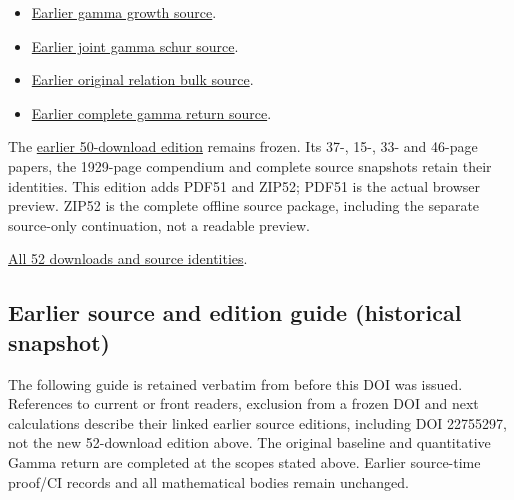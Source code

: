 \documentclass[
]{article}
\providecommand{\tightlist}{%
  \setlength{\itemsep}{0pt}\setlength{\parskip}{0pt}}
\begin{document}
\begin{itemize}
\tightlist
\item
  \href{https://github.com/KokunoYumeto/zeta-function-research-reader/tree/41f020e0475429943252e69a1b4edd849393c780/workbenches/splitzero-tandem/continuations/20260914-gamma-growth}{Earlier
  gamma growth source}.
\item
  \href{https://github.com/KokunoYumeto/zeta-function-research-reader/tree/2be3b23974bf040f4ea06240b8a4b85372f7c71d/workbenches/splitzero-tandem/continuations/20260914-joint-gamma-schur}{Earlier
  joint gamma schur source}.
\item
  \href{https://github.com/KokunoYumeto/zeta-function-research-reader/tree/01fc8820e3a3ea69afa22b8ab1b0b5ca61869456/workbenches/splitzero-tandem/continuations/20260914-original-relation-bulk}{Earlier
  original relation bulk source}.
\item
  \href{https://github.com/KokunoYumeto/zeta-function-research-reader/tree/01fc8820e3a3ea69afa22b8ab1b0b5ca61869456/workbenches/splitzero-tandem/continuations/20260914-complete-gamma-return}{Earlier
  complete gamma return source}.
\end{itemize}

The \href{https://doi.org/10.5281/zenodo.22755297}{earlier 50-download
edition} remains frozen. Its 37-, 15-, 33- and 46-page papers, the
1929-page compendium and complete source snapshots retain their
identities. This edition adds PDF51 and ZIP52; PDF51 is the actual
browser preview. ZIP52 is the complete offline source package, including
the separate source-only continuation, not a readable preview.

\href{calculation_edition_20260914_original_volumes/README.md}{All 52
downloads and source identities}.

\subsection{Earlier source and edition guide (historical
snapshot)}\label{earlier-source-and-edition-guide-historical-snapshot-17}

The following guide is retained verbatim from before this DOI was
issued. References to current or front readers, exclusion from a frozen
DOI and next calculations describe their linked earlier source editions,
including DOI 22755297, not the new 52-download edition above. The
original baseline and quantitative Gamma return are completed at the
scopes stated above. Earlier source-time proof/CI records and all
mathematical bodies remain unchanged.
\end{document}
